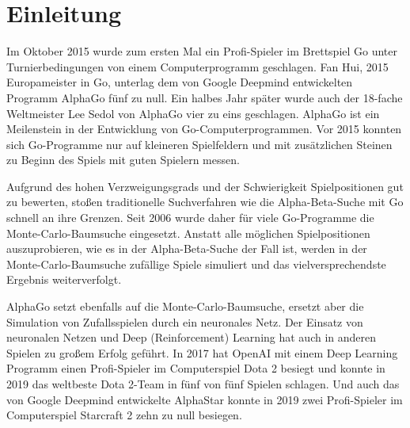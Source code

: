\section{Einleitung}

Im Oktober 2015 wurde zum ersten Mal ein Profi-Spieler im Brettspiel Go unter Turnierbedingungen von einem Computerprogramm geschlagen. Fan Hui, 2015 Europameister in Go, unterlag dem von Google Deepmind entwickelten Programm AlphaGo fünf zu null. Ein halbes Jahr später wurde auch der 18-fache Weltmeister Lee Sedol von AlphaGo vier zu eins geschlagen.\autocite{AlphaGoStoryFar} AlphaGo ist ein Meilenstein in der Entwicklung von Go-Computerprogrammen. Vor 2015 konnten sich Go-Programme nur auf kleineren Spielfeldern und mit zusätzlichen Steinen zu Beginn des Spiels mit guten Spielern messen.

Aufgrund des hohen Verzweigungsgrads und der Schwierigkeit Spielpositionen gut zu bewerten, stoßen traditionelle Suchverfahren wie die Alpha-Beta-Suche mit Go schnell an ihre Grenzen. Seit 2006 wurde daher für viele Go-Programme die Monte-Carlo-Baumsuche eingesetzt. Anstatt alle möglichen Spielpositionen auszuprobieren, wie es in der Alpha-Beta-Suche der Fall ist, werden in der Monte-Carlo-Baumsuche zufällige Spiele simuliert und das vielversprechendste Ergebnis weiterverfolgt.

AlphaGo setzt ebenfalls auf die Monte-Carlo-Baumsuche, ersetzt aber die Simulation von Zufallsspielen durch ein neuronales Netz. Der Einsatz von neuronalen Netzen und Deep (Reinforcement) Learning hat auch in anderen Spielen zu großem Erfolg geführt. In 2017 hat OpenAI mit einem Deep Learning Programm einen Profi-Spieler im Computerspiel Dota 2 besiegt und konnte in 2019 das weltbeste Dota 2-Team in fünf von fünf Spielen schlagen.\autocite{openaiDotaLargeScale2019} Und auch das von Google Deepmind entwickelte AlphaStar konnte in 2019 zwei Profi-Spieler im Computerspiel Starcraft 2 zehn zu null besiegen.

